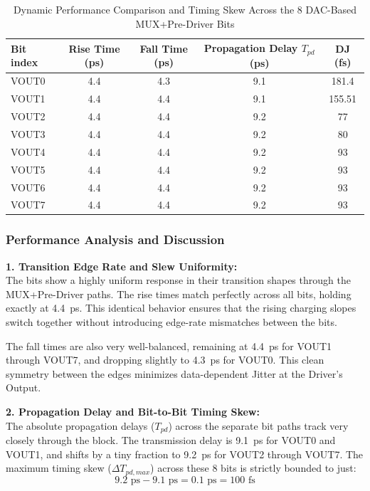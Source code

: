 \begin{table}[H]
    \centering
    \renewcommand{\arraystretch}{1.3}
    \setlength{\tabcolsep}{12pt}
    \begin{tabular}{|l|c|c|c|c|}
        \hline
        Bit index & Rise Time (ps) & Fall Time (ps) & Propagation Delay $T_{pd}$ (ps) & DJ (fs) \\ \hline
        VOUT0 & 4.4 & 4.3 & 9.1 & 181.4 \\ \hline
        VOUT1 & 4.4 & 4.4 & 9.1 & 155.51 \\ \hline
        VOUT2 & 4.4 & 4.4 & 9.2 & 77 \\ \hline
        VOUT3 & 4.4 & 4.4 & 9.2 & 80 \\ \hline
        VOUT4 & 4.4 & 4.4 & 9.2 & 93 \\ \hline
        VOUT5 & 4.4 & 4.4 & 9.2 & 93 \\ \hline
        VOUT6 & 4.4 & 4.4 & 9.2 & 93 \\ \hline
        VOUT7 & 4.4 & 4.4 & 9.2 & 93 \\ \hline
    \end{tabular}
    \vspace{2mm}
    \caption{Dynamic Performance Comparison and Timing Skew Across the 8 DAC-Based MUX+Pre-Driver Bits}
    \label{tab:mux_predriver_dac_based_metrics}
\end{table}
\clearpage

\subsubsection*{Performance Analysis and Discussion}
\textbf{1. Transition Edge Rate and Slew Uniformity:} \\
The bits show a highly uniform response in their transition shapes through the MUX+Pre-Driver paths. The rise times match perfectly across all bits, holding exactly at 4.4~ps. This identical behavior ensures that the rising charging slopes switch together without introducing edge-rate mismatches between the bits. 

The fall times are also very well-balanced, remaining at 4.4~ps for VOUT1 through VOUT7, and dropping slightly to 4.3~ps for VOUT0. This clean symmetry between the edges minimizes data-dependent Jitter at the Driver's Output.

\textbf{2. Propagation Delay and Bit-to-Bit Timing Skew:} \\
The absolute propagation delays ($T_{pd}$) across the separate bit paths track very closely through the block. The transmission delay is 9.1~ps for VOUT0 and VOUT1, and shifts by a tiny fraction to 9.2~ps for VOUT2 through VOUT7. The maximum timing skew ($\Delta T_{pd,max}$) across these 8 bits is strictly bounded to just:
$$9.2\text{ ps} - 9.1\text{ ps} = 0.1\text{ ps} = 100\text{ fs}$$

